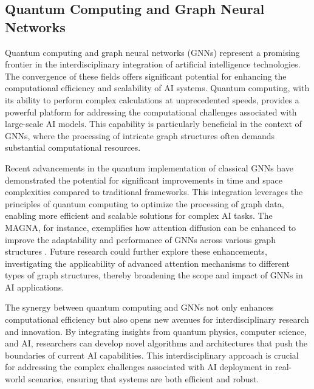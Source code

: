 \subsection{Quantum Computing and Graph Neural Networks} \label{subsec:Quantum Computing and Graph Neural Networks}

Quantum computing and graph neural networks (GNNs) represent a promising frontier in the interdisciplinary integration of artificial intelligence technologies. The convergence of these fields offers significant potential for enhancing the computational efficiency and scalability of AI systems. Quantum computing, with its ability to perform complex calculations at unprecedented speeds, provides a powerful platform for addressing the computational challenges associated with large-scale AI models. This capability is particularly beneficial in the context of GNNs, where the processing of intricate graph structures often demands substantial computational resources.



Recent advancements in the quantum implementation of classical GNNs have demonstrated the potential for significant improvements in time and space complexities compared to traditional frameworks. This integration leverages the principles of quantum computing to optimize the processing of graph data, enabling more efficient and scalable solutions for complex AI tasks. The MAGNA, for instance, exemplifies how attention diffusion can be enhanced to improve the adaptability and performance of GNNs across various graph structures \cite{wang2021multihopattentiongraphneural}. Future research could further explore these enhancements, investigating the applicability of advanced attention mechanisms to different types of graph structures, thereby broadening the scope and impact of GNNs in AI applications.



The synergy between quantum computing and GNNs not only enhances computational efficiency but also opens new avenues for interdisciplinary research and innovation. By integrating insights from quantum physics, computer science, and AI, researchers can develop novel algorithms and architectures that push the boundaries of current AI capabilities. This interdisciplinary approach is crucial for addressing the complex challenges associated with AI deployment in real-world scenarios, ensuring that systems are both efficient and robust.





